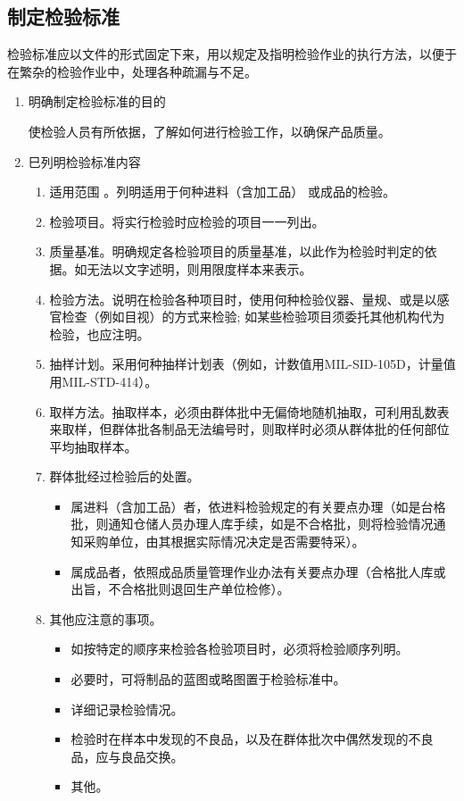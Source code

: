 \subsection {制定检验标准}

    检验标准应以文件的形式固定下来，用以规定及指明检验作业的执行方法，以便于在繁杂的检验作业中，处理各种疏漏与不足。

    \begin{enumerate}

    \item 明确制定检验标准的目的

        使检验人员有所依据，了解如何进行检验工作，以确保产品质量。

    \item 巳列明检验标准内容

        \begin{enumerate}
            \item 适用范围 。列明适用于何种进料（含加工品） 或成品的检验。
            \item 检验项目。将实行检验时应检验的项目一一列出。
            \item 质量基准。明确规定各检验项目的质量基准，以此作为检验时判定的依据。如无法以文字述明，则用限度样本来表示。
            \item 检验方法。说明在检验各种项目时，使用何种检验仪器、量规、或是以感官检查（例如目视）的方式来检验; 如某些检验项目须委托其他机构代为检验，也应注明。
            \item 抽样计划。采用何种抽样计划表（例如，计数值用MIL-SID-105D，计量值用MIL-STD-414）。
            \item 取样方法。抽取样本，必须由群体批中无偏倚地随机抽取，可利用乱数表来取样，但群体批各制品无法编号时，则取样时必须从群体批的任何部位平均抽取样本。
            \item 群体批经过检验后的处置。
                \begin{itemize}
                    \item 属进料（含加工品）者，依进料检验规定的有关要点办理（如是台格批，则通知仓储人员办理人库手续，如是不合格批，则将检验情况通知采购单位，由其根据实际情况决定是否需要特采）。
                    \item 属成品者，依照成品质量管理作业办法有关要点办理（合格批人库或出旨，不合格批则退回生产单位检修）。
                \end{itemize}

            \item 其他应注意的事项。
                \begin{itemize}
                    \item 如按特定的顺序来检验各检验项目时，必须将检验顺序列明。
                    \item 必要时，可将制品的蓝图或略图置于检验标准中。
                    \item 详细记录检验情况。
                    \item 检验时在样本中发现的不良品，以及在群体批次中偶然发现的不良品，应与良品交换。
                    \item 其他。
                \end{itemize}


\end{enumerate}
\end{enumerate}
